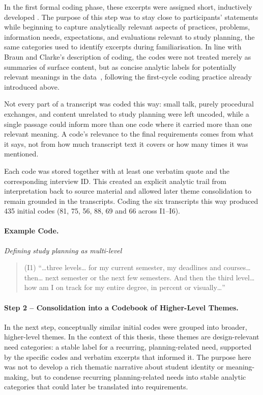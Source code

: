 In the first formal coding phase, these excerpts were assigned short, inductively developed . The purpose of this step was to stay close to participants' statements while beginning to capture analytically relevant aspects of practices, problems, information needs, expectations, and evaluations relevant to study planning, the same categories used to identify excerpts during familiarisation. In line with Braun and Clarke's description of coding, the codes were not treated merely as summaries of surface content, but as concise analytic labels for potentially relevant meanings in the data~\cite[pp.~51--71]{braun_thematic_2022}, following the first-cycle coding practice already introduced above.

Not every part of a transcript was coded this way: small talk, purely procedural exchanges, and content unrelated to study planning were left uncoded, while a single passage could inform more than one code where it carried more than one relevant meaning. A code's relevance to the final requirements comes from what it says, not from how much transcript text it covers or how many times it was mentioned.

Each code was stored together with at least one verbatim quote and the corresponding interview ID. This created an explicit analytic trail from interpretation back to source material and allowed later theme consolidation to remain grounded in the transcripts. Coding the six transcripts this way produced 435 initial codes (81, 75, 56, 88, 69 and 66 across I1--I6).

\paragraph{Example Code.}
\emph{Defining study planning as multi-level}
\begin{quote}
(I1) \enquote{…three levels… for my current semester, my deadlines and courses… then… next semester or the next few semesters. And then the third level… how am I on track for my entire degree, in percent or visually…}
\end{quote}

\paragraph{Step 2 -- Consolidation into a Codebook of Higher-Level Themes.}
\label{sec:theme-consolidation}

In the next step, conceptually similar initial codes were grouped into broader, higher-level themes. In the context of this thesis, these themes are design-relevant need categories: a stable label for a recurring, planning-related need, supported by the specific codes and verbatim excerpts that informed it. The purpose here was not to develop a rich thematic narrative about student identity or meaning-making, but to condense recurring planning-related needs into stable analytic categories that could later be translated into requirements.


